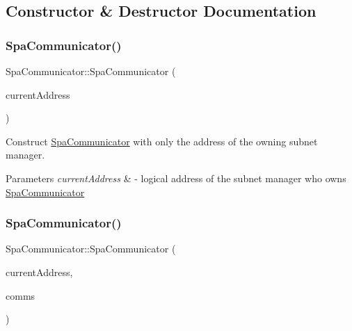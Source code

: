 \subsection{Constructor \& Destructor Documentation}
\mbox{\label{classSpaCommunicator_a4ed78daf6517b608f93dd894b65dab55}} 
\subsubsection{\texorpdfstring{Spa\+Communicator()}{SpaCommunicator()}\hspace{0.1cm}{\footnotesize\ttfamily [1/2]}}
{\footnotesize\ttfamily Spa\+Communicator\+::\+Spa\+Communicator (\begin{DoxyParamCaption}\item[{\hyperlink{structLogicalAddress}{Logical\+Address}}]{current\+Address }\end{DoxyParamCaption})}



Construct \hyperlink{classSpaCommunicator}{Spa\+Communicator} with only the address of the owning subnet manager. 


\begin{DoxyParams}{Parameters}
{\em current\+Address} & -\/ logical address of the subnet manager who owns \hyperlink{classSpaCommunicator}{Spa\+Communicator} \\
\hline
\end{DoxyParams}
\mbox{\label{classSpaCommunicator_a09fa278da37e95831a04896ec24dd227}} 
\subsubsection{\texorpdfstring{Spa\+Communicator()}{SpaCommunicator()}\hspace{0.1cm}{\footnotesize\ttfamily [2/2]}}
{\footnotesize\ttfamily Spa\+Communicator\+::\+Spa\+Communicator (\begin{DoxyParamCaption}\item[{\hyperlink{structLogicalAddress}{Logical\+Address}}]{current\+Address,  }\item[{std\+::vector$<$ std\+::shared\+\_\+ptr$<$ \hyperlink{classPhysicalCommunicator}{Physical\+Communicator} $>$$>$}]{comms }\end{DoxyParamCaption})}




